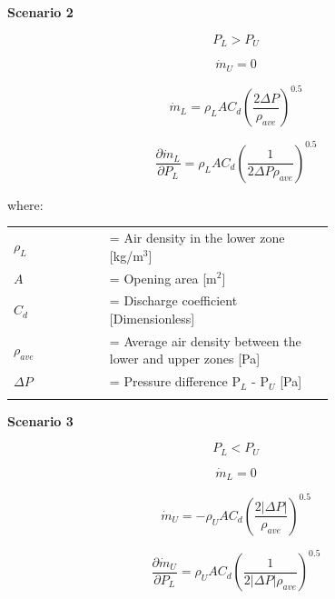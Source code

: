 \textbf{Scenario 2}

\begin{equation}
P_L > P_U
\end{equation}

\begin{equation}
\dot{m}_U = 0
\end{equation}

\begin{equation}
\dot{m}_L = \rho_L A C_d \left( {\frac{2\Delta P}{\rho_{ave}}} \right)^{0.5}
\end{equation}

\begin{equation}
\frac{\partial \dot{m}_L}{\partial {P_L}} = \rho_L A C_d \left( \frac{1}{2\Delta P \rho_{ave}} \right)^{0.5}
\end{equation}

where:

\begin{tabular}{lp{0.7\linewidth}}
\\
$\rho_L$ &= Air density in the lower zone [kg/m\(^{3}\)]\\
$A$ &= Opening area [m\(^{2}\)] \\
$C_d$ &= Discharge coefficient [Dimensionless]\\
$\rho_{ave}$ &= Average air density between the lower and upper zones [Pa] \\
$\Delta P$ &= Pressure difference P\(_{L}\) - P\(_{U}\) [Pa]\\
\\
\end{tabular}

\textbf{Scenario 3}

\begin{equation}
P_L < P_U
\end{equation}

\begin{equation}
\dot{m}_L = 0
\end{equation}

\begin{equation}
\dot{m}_U =  - {\rho_U}A{C_d}{\left( {\frac{{2\left| {\Delta P} \right|}}{{{\rho_{ave}}}}} \right)^{0.5}}
\end{equation}

\begin{equation}
\frac{{\partial \dot{m}_U}}{{\partial {P_L}}} = {\rho_U}A{C_d}{\left( {\frac{1}{{2\left| {\Delta P} \right|{\rho_{ave}}}}} \right)^{0.5}}
\end{equation}

